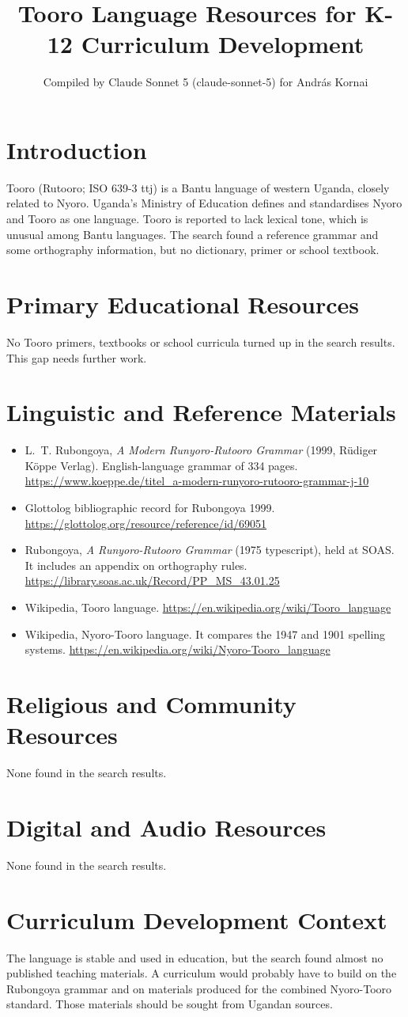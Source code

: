 \documentclass[12pt]{article}
\title{Tooro Language Resources for K-12 Curriculum Development}
\author{Compiled by Claude Sonnet 5 (claude-sonnet-5) for Andr\'as Kornai}
\date{}
\begin{document}
\maketitle
\section{Introduction}
Tooro (Rutooro; ISO 639-3 ttj) is a Bantu language of western Uganda, closely related to Nyoro. Uganda's Ministry of Education defines and standardises Nyoro and Tooro as one language. Tooro is reported to lack lexical tone, which is unusual among Bantu languages. The search found a reference grammar and some orthography information, but no dictionary, primer or school textbook.
\section{Primary Educational Resources}
No Tooro primers, textbooks or school curricula turned up in the search results. This gap needs further work.
\section{Linguistic and Reference Materials}
\begin{itemize}
\item L.~T. Rubongoya, \emph{A Modern Runyoro-Rutooro Grammar} (1999, Rüdiger Köppe Verlag). English-language grammar of 334 pages. \url{https://www.koeppe.de/titel_a-modern-runyoro-rutooro-grammar-j-10}
\item Glottolog bibliographic record for Rubongoya 1999. \url{https://glottolog.org/resource/reference/id/69051}
\item Rubongoya, \emph{A Runyoro-Rutooro Grammar} (1975 typescript), held at SOAS. It includes an appendix on orthography rules. \url{https://library.soas.ac.uk/Record/PP_MS_43.01.25}
\item Wikipedia, Tooro language. \url{https://en.wikipedia.org/wiki/Tooro_language}
\item Wikipedia, Nyoro-Tooro language. It compares the 1947 and 1901 spelling systems. \url{https://en.wikipedia.org/wiki/Nyoro-Tooro_language}
\end{itemize}
\section{Religious and Community Resources}
None found in the search results.
\section{Digital and Audio Resources}
None found in the search results.
\section{Curriculum Development Context}
The language is stable and used in education, but the search found almost no published teaching materials. A curriculum would probably have to build on the Rubongoya grammar and on materials produced for the combined Nyoro-Tooro standard. Those materials should be sought from Ugandan sources.
\end{document}
